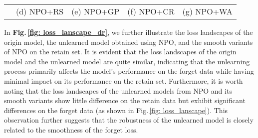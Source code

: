 \begin{figure*}[htbp]
\begin{tabular}{ccccc}
&

\hspace*{-3mm}
\small{(d) NPO+RS}
&
\hspace*{-3mm}
\small{(e) NPO+GP}
&
\hspace*{-3mm}
\small{(f) NPO+CR}
&
\hspace*{-3mm}
\small{(g) NPO+WA}
\\
\end{tabular}

\vspace*{-2mm}
\caption{\small{
The prediction loss landscape of the original model, along with the NPO and smooth variants of the NPO-unlearned model, on the retain set.
}}
\label{fig: loss_lanscape_dr}
\end{figure*}

In \textbf{Fig.\,\ref{fig: loss_lanscape_dr}}, we further illustrate the loss landscapes of the origin model, the unlearned model obtained using NPO, and the smooth variants of NPO on the retain set. It is evident that the loss landscapes of the origin model and the unlearned model are quite similar, indicating that the unlearning process primarily affects the model's performance on the forget data while having minimal impact on its performance on the retain set. Furthermore, it is worth noting that the loss landscapes of the unlearned models from NPO and its smooth variants show little difference on the retain data but exhibit significant differences on the forget data (as shown in Fig.\,\ref{fig: loss_lanscape}). This observation further suggests that the robustness of the unlearned model is closely related to the smoothness of the forget loss.




